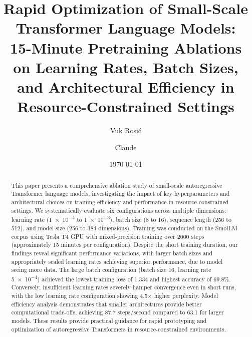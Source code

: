 \documentclass[11pt,a4paper]{article}
\title{\Large\bfseries Rapid Optimization of Small-Scale Transformer Language Models:\\[0.3em]
\large 15-Minute Pretraining Ablations on Learning Rates, Batch Sizes, and Architectural Efficiency in Resource-Constrained Settings}
\author[1]{Vuk Rosić}
\author[2]{Claude}
\affil[1]{Óbuda University, \texttt{vukrosic1@gmail.com}}
\affil[2]{Anthropic}
\date{\today}
\begin{document}
\maketitle

\begin{abstract}
This paper presents a comprehensive ablation study of small-scale autoregressive Transformer language models, investigating the impact of key hyperparameters and architectural choices on training efficiency and performance in resource-constrained settings. We systematically evaluate six configurations across multiple dimensions: learning rate (\num{1e-4} to \num{1e-3}), batch size (8 to 16), sequence length (256 to 512), and model size (256 to 384 dimensions). Training was conducted on the SmolLM corpus using Tesla T4 GPU with mixed-precision training over 2000 steps (approximately 15 minutes per configuration). Despite the short training duration, our findings reveal significant performance variations, with larger batch sizes and appropriately scaled learning rates achieving superior performance, due to model seeing more data. The large batch configuration (batch size 16, learning rate \num{5e-4}) achieved the lowest training loss of 1.334 and highest accuracy of 69.8\%. Conversely, insufficient learning rates severely hamper convergence even in short runs, with the low learning rate configuration showing 4.5× higher perplexity. Model efficiency analysis demonstrates that smaller architectures provide better computational trade-offs, achieving 87.7 steps/second compared to 63.1 for larger models. These results provide practical guidance for rapid prototyping and optimization of autoregressive Transformers in resource-constrained environments.
\end{abstract}
\end{document}
